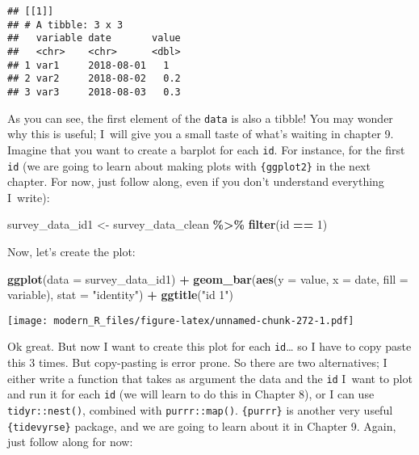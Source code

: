 \documentclass[
]{article}
\newenvironment{Shaded}{\begin{snugshade}}{\end{snugshade}}
\newcommand{\DataTypeTok}[1]{\textcolor[rgb]{0.13,0.29,0.53}{#1}}
\newcommand{\DecValTok}[1]{\textcolor[rgb]{0.00,0.00,0.81}{#1}}
\newcommand{\KeywordTok}[1]{\textcolor[rgb]{0.13,0.29,0.53}{\textbf{#1}}}
\newcommand{\NormalTok}[1]{#1}
\newcommand{\OperatorTok}[1]{\textcolor[rgb]{0.81,0.36,0.00}{\textbf{#1}}}
\newcommand{\StringTok}[1]{\textcolor[rgb]{0.31,0.60,0.02}{#1}}
\begin{document}
\begin{verbatim}
## [[1]]
## # A tibble: 3 x 3
##   variable date       value
##   <chr>    <chr>      <dbl>
## 1 var1     2018-08-01   1  
## 2 var2     2018-08-02   0.2
## 3 var3     2018-08-03   0.3
\end{verbatim}

As you can see, the first element of the \texttt{data} is also a tibble! You may wonder why this is useful;
I~will give you a small taste of what's waiting in chapter 9. Imagine that you want to create a
barplot for each \texttt{id}. For instance, for the first \texttt{id} (we are going to learn about making plots
with \texttt{\{ggplot2\}} in the next chapter. For now, just follow along, even if you don't understand
everything I~write):

\begin{Shaded}
\begin{Highlighting}[]
\NormalTok{survey\_data\_id1 \textless{}{-}}\StringTok{ }\NormalTok{survey\_data\_clean }\OperatorTok{\%\textgreater{}\%}
\StringTok{    }\KeywordTok{filter}\NormalTok{(id }\OperatorTok{==}\StringTok{ }\DecValTok{1}\NormalTok{)}
\end{Highlighting}
\end{Shaded}

Now, let's create the plot:

\begin{Shaded}
\begin{Highlighting}[]
\KeywordTok{ggplot}\NormalTok{(}\DataTypeTok{data =}\NormalTok{ survey\_data\_id1) }\OperatorTok{+}
\StringTok{    }\KeywordTok{geom\_bar}\NormalTok{(}\KeywordTok{aes}\NormalTok{(}\DataTypeTok{y =}\NormalTok{ value, }\DataTypeTok{x =}\NormalTok{ date, }\DataTypeTok{fill =}\NormalTok{ variable), }\DataTypeTok{stat =} \StringTok{"identity"}\NormalTok{) }\OperatorTok{+}
\StringTok{    }\KeywordTok{ggtitle}\NormalTok{(}\StringTok{"id 1"}\NormalTok{)}
\end{Highlighting}
\end{Shaded}

\texttt{[image: modern\_R\_files/figure-latex/unnamed-chunk-272-1.pdf]}

Ok great. But now I want to create this plot for each \texttt{id}\ldots{} so I have to copy paste this 3 times.
But copy-pasting is error prone. So there are two alternatives; I either write a function that
takes as argument the data and the \texttt{id} I~want to plot and run it for each \texttt{id} (we will learn to
do this in Chapter 8), or I can use \texttt{tidyr::nest()}, combined with \texttt{purrr::map()}. \texttt{\{purrr\}} is
another very useful \texttt{\{tidevyrse\}} package, and we are going to learn about it in Chapter 9. Again,
just follow along for now:
\end{document}
